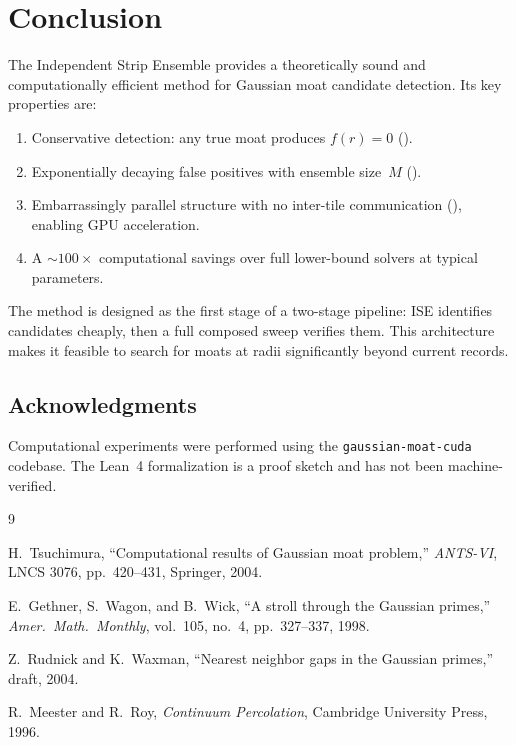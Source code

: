 \documentclass[11pt,a4paper]{article}
\theoremstyle{definition}
\theoremstyle{remark}
\begin{document}
\section{Conclusion}

The Independent Strip Ensemble provides a theoretically sound and
computationally efficient method for Gaussian moat candidate
detection.  Its key properties are:
\begin{enumerate}
  \item Conservative detection: any true moat produces $f(r)=0$
    ().
  \item Exponentially decaying false positives with ensemble
    size~$M$ ().
  \item Embarrassingly parallel structure with no inter-tile
    communication (), enabling GPU acceleration.
  \item A $\sim 100\times$ computational savings over full
    lower-bound solvers at typical parameters.
\end{enumerate}

The method is designed as the first stage of a two-stage pipeline:
ISE identifies candidates cheaply, then a full composed sweep
verifies them.  This architecture makes it feasible to search for
moats at radii significantly beyond current records.

\subsection*{Acknowledgments}

Computational experiments were performed using the
\texttt{gaussian-moat-cuda} codebase.  The Lean~4 formalization is
a proof sketch and has not been machine-verified.

\begin{thebibliography}{9}

H.~Tsuchimura,
``Computational results of Gaussian moat problem,''
\emph{ANTS-VI}, LNCS 3076, pp.~420--431, Springer, 2004.

E.~Gethner, S.~Wagon, and B.~Wick,
``A stroll through the Gaussian primes,''
\emph{Amer.\ Math.\ Monthly}, vol.~105, no.~4, pp.~327--337, 1998.

Z.~Rudnick and K.~Waxman,
``Nearest neighbor gaps in the Gaussian primes,'' draft, 2004.

R.~Meester and R.~Roy,
\emph{Continuum Percolation}, Cambridge University Press, 1996.

\end{thebibliography}
\end{document}
